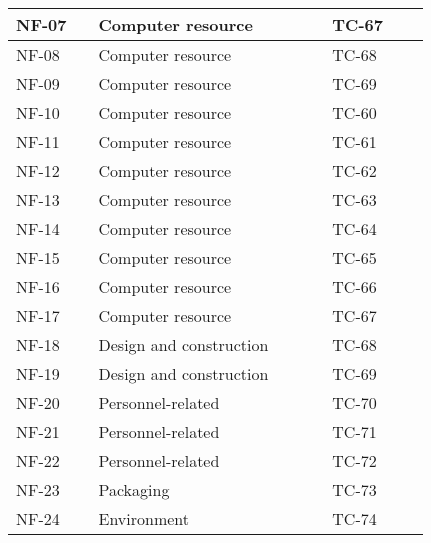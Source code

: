 \begin{sidewaystable}
\begin{longtable}{| p{1.1cm}  | p{2cm}  | p{5cm} |  p{1.5cm}  | p{1.5cm}  |  p{1.5cm}  | p{1.5cm}  |  p{1.5cm}  | p{2cm}  |  }
		NF-07&& Computer resource&&&& TC-67 && \\ \hline
		NF-08&& Computer resource&&&& TC-68 && \\ \hline
		NF-09&& Computer resource&&&& TC-69 && \\ \hline
		NF-10&& Computer resource&&&& TC-60 && \\ \hline
		NF-11&& Computer resource&&&& TC-61 && \\ \hline
		NF-12&& Computer resource&&&& TC-62 && \\ \hline
		NF-13&& Computer resource&&&& TC-63 && \\ \hline
		NF-14&& Computer resource&&&& TC-64 && \\ \hline
		NF-15&& Computer resource&&&& TC-65 && \\ \hline
		NF-16&& Computer resource&&&& TC-66 && \\ \hline
		NF-17&& Computer resource&&&& TC-67 && \\ \hline
		NF-18&& Design and construction&&&& TC-68 && \\ \hline
		NF-19&& Design and construction&&&& TC-69 && \\ \hline
		NF-20&& Personnel-related&&&& TC-70 && \\ \hline
		NF-21&& Personnel-related&&&& TC-71 && \\ \hline
		NF-22&& Personnel-related&&&& TC-72 && \\ \hline
		NF-23&& Packaging&&&& TC-73 && \\ \hline
		NF-24&& Environment&&&& TC-74 && \\ \hline
	\end{longtable}
\end{sidewaystable}